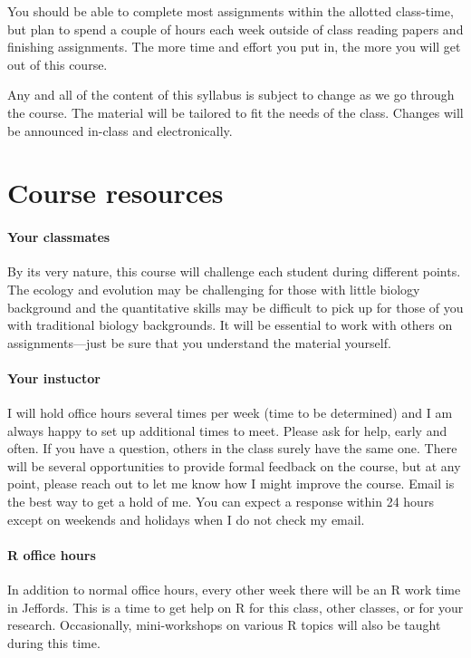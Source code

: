 \documentclass[12pt,]{article}
\let\oldparagraph\paragraph
\renewcommand{\paragraph}[1]{\oldparagraph{#1}\mbox{}}
\begin{document}
You should be able to complete most assignments within the allotted
class-time, but plan to spend a couple of hours each week outside of
class reading papers and finishing assignments. The more time and effort
you put in, the more you will get out of this course.

Any and all of the content of this syllabus is subject to change as we
go through the course. The material will be tailored to fit the needs of
the class. Changes will be announced in-class and electronically.

\section{Course resources}\label{course-resources}

\paragraph{Your classmates}\label{your-classmates}

By its very nature, this course will challenge each student during
different points. The ecology and evolution may be challenging for those
with little biology background and the quantitative skills may be
difficult to pick up for those of you with traditional biology
backgrounds. It will be essential to work with others on
assignments---just be sure that you understand the material yourself.

\paragraph{Your instuctor}\label{your-instuctor}

I will hold office hours several times per week (time to be determined)
and I am always happy to set up additional times to meet. Please ask for
help, early and often. If you have a question, others in the class
surely have the same one. There will be several opportunities to provide
formal feedback on the course, but at any point, please reach out to let
me know how I might improve the course. Email is the best way to get a
hold of me. You can expect a response within 24 hours except on weekends
and holidays when I do not check my email.

\paragraph{R office hours}\label{r-office-hours}

In addition to normal office hours, every other week there will be an R
work time in Jeffords. This is a time to get help on R for this class,
other classes, or for your research. Occasionally, mini-workshops on
various R topics will also be taught during this time.
\end{document}
